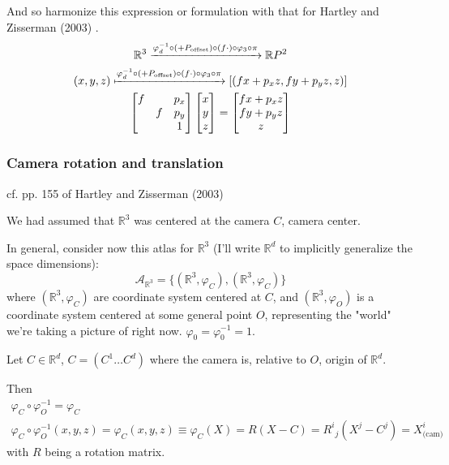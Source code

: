 \documentclass[10pt]{amsart}
\begin{document}
\begin{multicols*}{2}
And so harmonize this expression or formulation with that for Hartley and Zisserman (2003) \cite{HaZi2003}.   
\begin{equation}
\begin{gathered}
	\mathbb{R}^3 \xrightarrow{ \varphi_d^{-1} \circ (+P_{\text{offset}} ) \circ (f\cdot) \circ \varphi_3 \circ \pi } \mathbb{R}P^2 \\
(x,y,z) \xmapsto{ \varphi_d^{-1} \circ (+P_{\text{offset}} )\circ (f\cdot) \circ \varphi_3 \circ \pi } [(fx+p_xz, fy+p_yz,z)] \\ 
\left[ \begin{matrix} f & & p_x \\ & f & p_y \\ & & 1 \end{matrix} \right] \left[ \begin{matrix} x \\ y \\ z \end{matrix} \right] = \left[ \begin{matrix} fx+p_x z \\ fy + p_y z \\ z \end{matrix} \right]
\end{gathered}
\end{equation}

\subsubsection{Camera rotation and translation}  cf. pp. 155 of Hartley and Zisserman (2003) \cite{HaZi2003}

We had assumed that $\mathbb{R}^3$ was centered at the camera $C$, camera center.  

In general, consider now this atlas for $\mathbb{R}^3$ (I'll write $\mathbb{R}^d$ to implicitly generalize the space dimensions):  
\[
\mathcal{A}_{\mathbb{R}^3} = \lbrace (\mathbb{R}^3, \varphi_C ) ,(\mathbb{R}^3,\varphi_C) \rbrace
\]
where $(\mathbb{R}^3, \varphi_C )$ are coordinate system centered at $C$, and $(\mathbb{R}^3, \varphi_O )$ is a coordinate system centered at some general point $O$, representing the "world" we're taking a picture of right now.  $\varphi_0 = \varphi^{-1}_0 = 1$.  

Let $C \in \mathbb{R}^d$, $C= (C^1\dots C^d)$ where the camera is, relative to $O$, origin of $\mathbb{R}^d$.  

Then 
\[
\begin{gathered}
\varphi_C \circ \varphi_O^{-1} = \varphi_C \\ 
 \varphi_C \circ \varphi_O^{-1}  (x,y,z) = \varphi_C(x,y,z) \equiv \varphi_C(X) = R(X-C) = R^i_{ \  \  j } (X^j-C^j) = X^i_{\text{(cam)} }
\end{gathered}
\]
with $R$ being a rotation matrix.  


\end{multicols*}
\end{document}
